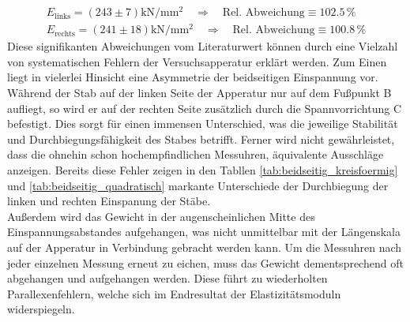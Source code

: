 \begin{gather}
\label{eqn:schlechte_Werte_k}
    E_\text{links} =   \left( 243    \pm 7\right)\unit{\kilo \newton \per \milli \meter \squared}\quad \Rightarrow \quad \text{Rel. Abweichung} \equiv 102.5\,\unit{\percent}\\
    E_\text{rechts} =  \left( 241    \pm 18\right)\unit{\kilo \newton \per \milli \meter \squared}\quad \Rightarrow \quad \text{Rel. Abweichung} \equiv 100.8\,\unit{\percent}
\end{gather}
\noindent
Diese signifikanten Abweichungen vom Literaturwert können durch eine Vielzahl von systematischen Fehlern der Versuchsapperatur erklärt werden.
Zum Einen liegt in vielerlei Hinsicht eine Asymmetrie der beidseitigen Einspannung vor. Während der Stab auf der linken Seite der Apperatur nur auf dem
Fußpunkt B aufliegt, so wird er auf der rechten Seite zusätzlich durch die Spannvorrichtung C befestigt. Dies sorgt für einen immensen Unterschied,
was die jeweilige Stabilität und Durchbiegungsfähigkeit des Stabes betrifft. Ferner wird nicht gewährleistet, dass die ohnehin schon hochempfindlichen 
Messuhren, äquivalente Ausschläge anzeigen. Bereits diese Fehler zeigen in den Tabllen \ref{tab:beidseitig_kreisfoermig} und \ref{tab:beidseitig_quadratisch}
markante Unterschiede der Durchbiegung der linken und rechten Einspanung der Stäbe.\\
Außerdem wird das Gewicht in der augenscheinlichen Mitte des Einspannungsabstandes aufgehangen, was nicht unmittelbar mit der Längenskala auf der Apperatur
in Verbindung gebracht werden kann. Um die Messuhren nach jeder einzelnen Messung erneut zu eichen, muss das Gewicht dementsprechend oft abgehangen und aufgehangen 
werden. Diese führt zu wiederholten Parallexenfehlern, welche sich im Endresultat der Elastizitätsmoduln widerspiegeln. 
%
